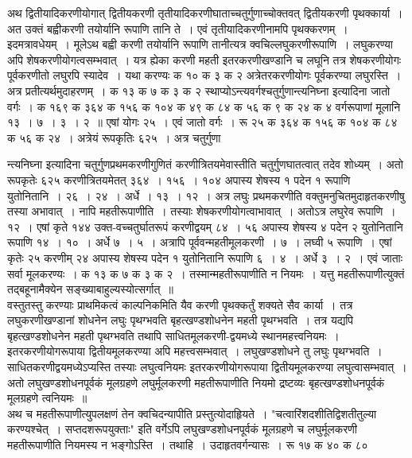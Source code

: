 \documentclass[11pt, openany]{book}
\begin{document}
\vspace{-3mm}
 अथ द्वितीयादिकरणीयोगात् द्वितीयकरणी तृतीयादिकरणीघाताच्चतुर्गुणाच्चोक्तवत् द्वितीयकरणी पृथक्कार्या~। अत उक्तं बह्वीकरणी तयोर्यानि रूपाणि तानि ते~। एवं तृतीयादिकरणीनामपि पृथक्करणम्~। इदमत्रावधेयम्~। मूलेऽथ बह्वी करणी तयोर्यानि रूपाणि तानीत्यत्र क्वचिल्लघुकरणीरूपाणि~। लघुकरण्या अपि शेषकरणीयोगत्वसम्भवात्~। यत्र ह्येका करणी महती इतरकरणीखण्डानि च लघूनि तत्र शेषकरणीयोगः पूर्वकरणीतो लघुरपि स्यादेव~। यथा करण्यः क १० क ३ क २ अत्रेतरकरणीयोगः पूर्वकरण्या लघुरस्ति~। अत्र प्रतीत्यर्थमुदाहरणम्~। क १३ 
क ७ क ३ क २ स्थाप्योऽन्त्यवर्गश्चतुर्गुणान्त्यनिघ्ना इत्यादिना जातो
वर्गः~। क १६९ क ३६४ क १५६ क १०४ क ४९ क ८४ 
क ५६ क ९ क २४ क ४ वर्गरूपाणां मूलानि १३~। ७~। ३~। २~॥
एषां योगः २५~। एवं जातो वर्गः~। रू २५ क ३६४ क १५६ 
क १०४ क ८४ क ५६ क २४~। अत्रेयं रूपकृतिः ६२५~। अत्र चतुर्गुणा\textendash
\newpage%

\noindent न्त्यनिघ्ना इत्यादिना चतुर्गुणप्रथमकरणीगुणितं करणीत्रितयमेवास्तीति
चतुर्गुणघातत्वात् तदेव शोध्यम्~। अतो रूपकृतेः ६२५ करणीत्रितयमेतत् ३६४~। १५६~। १०४ अपास्य शेषस्य १ पदेन १ रूपाणि युतोनितानि~। २६~। २४~। अर्धे~। १३~। १२~। अत्र लघुः प्रथमकरणीति वक्तुमनुचितमुदाहृतकरणीषु तस्या अभावात्~। नापि महतीरूपाणीति~। तस्याः शेषकरणीयोगत्वाभावात्~। अतोऽत्र लघुरेव
रूपाणि~। १२~। एषां कृते १४४ उक्त-वच्चतुर्घातरूपं करणीद्वयम् ८४~। ५६ अपास्य 
शेषस्य ४ पदेन २ युतोनितानि रूपाणि १४~। १०~। अर्धे ७~। ५~। 
अत्रापि पूर्ववन्महतीमूलकरणी~। ७~। लघ्वी ५ रूपाणि~। एषां कृतेः 
२५ करणीम् २४ अपास्य शेषस्य पदेन १ युतोनितानि रूपाणि ६~। ४~। 
अर्धे ३~। २~। एवं जाताः सर्वा मूलकरण्यः~। क १३ क ७ क ३ 
क २~। तस्मान्महतीरूपाणीति न नियमः~। यत्तु महतीरूपाणीत्युक्तं
तद्बहूनामैक्येन सङ्ख्याबाहुल्यस्योत्सर्गात्~॥ \\

\vspace{-3mm}
 वस्तुतस्तु करण्याः प्राथमिकत्वं काल्पनिकमिति यैव करणी पृथक्कर्तुं 
शक्यते सैव कार्या~। तत्र लघुकरणीखण्डानां शोधनेन लघुः पृथग्भवति बृहत्खण्डशोधनेन महती पृथग्भवति~। तत्र यद्यपि बृहत्खण्डशोधनेन महती पृथग्भवति
तथापि साधितमूलकरणी-द्वयमध्ये स्थानमहत्त्वनियमः~। इतरकरणीयोगरूपाया 
द्वितीयमूलकरण्या अपि महत्त्वसम्भवात्~। लघुखण्डशोधने तु लघुः पृथग्भवति~। 
साधितकरणीद्वयमध्येऽप्यस्ति तस्याः लघुत्वनियमः इतरकरणीयोगरूपाया 
द्वितीयमूलकरण्या लघुत्वासम्भवात्~। अतो लघुखण्डशोधनपूर्वकं मूलग्रहणे 
लघुर्मूलकरणी महतीरूपाणीति नियमो द्रष्टव्यः बृहत्खण्डशोधनपूर्वकं 
मूलग्रहणे त्वनियमः~॥ \\

\vspace{-3mm}
 अथ च महतीरूपाणीत्युपलक्षणं तेन क्वचिदन्यापीति प्रस्तुत्योदाहृियते~। 
{\qt "चत्वारिंशदशीतिद्विशतीतुल्या करण्यश्चेत्~। सप्तदशरूपयुक्ताः"} इति
वर्गेऽपि लघुखण्डशोधनपूर्वकं मूलग्रहणे च लघुर्मूलकरणी महतीरूपाणीति नियमस्य 
न भङ्गोऽस्ति~। तथाहि~। उदाहृतवर्गन्यासः~। रू १७ क ४० क ८०
\newpage%
\end{document}
